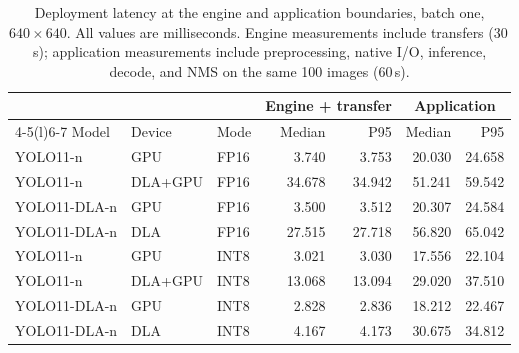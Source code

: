 \begin{table}[t]
\caption{Deployment latency at the engine and application boundaries, batch one, $640\times640$. All values are milliseconds. Engine measurements include transfers (30\,s); application measurements include preprocessing, native I/O, inference, decode, and NMS on the same 100 images (60\,s).}
\label{tab:latency}\centering\footnotesize
\setlength{\tabcolsep}{4pt}
\begin{tabular*}{\textwidth}{@{\extracolsep{\fill}}lllrrrr@{}}
\toprule
& & & \multicolumn{2}{c}{Engine + transfer} & \multicolumn{2}{c}{Application} \\
\cmidrule(lr){4-5}\cmidrule(l){6-7}
Model & Device & Mode & Median & P95 & Median & P95 \\
\midrule
YOLO11-n & GPU & FP16 & 3.740 & 3.753 & 20.030 & 24.658 \\
YOLO11-n & DLA+GPU & FP16 & 34.678 & 34.942 & 51.241 & 59.542 \\
YOLO11-DLA-n & GPU & FP16 & 3.500 & 3.512 & 20.307 & 24.584 \\
YOLO11-DLA-n & DLA & FP16 & 27.515 & 27.718 & 56.820 & 65.042 \\
\midrule
YOLO11-n & GPU & INT8 & 3.021 & 3.030 & 17.556 & 22.104 \\
YOLO11-n & DLA+GPU & INT8 & 13.068 & 13.094 & 29.020 & 37.510 \\
YOLO11-DLA-n & GPU & INT8 & 2.828 & 2.836 & 18.212 & 22.467 \\
YOLO11-DLA-n & DLA & INT8 & 4.167 & 4.173 & 30.675 & 34.812 \\
\bottomrule
\end{tabular*}
\end{table}
